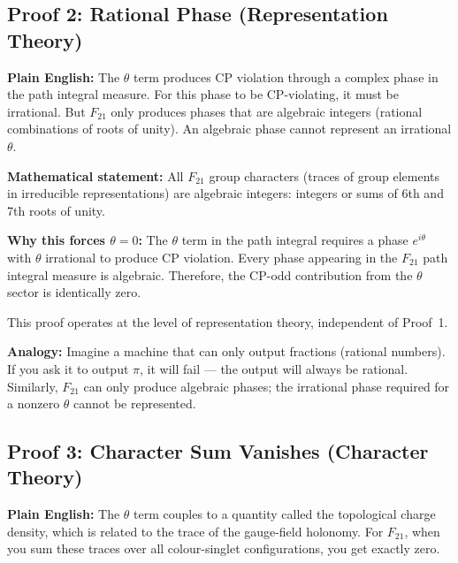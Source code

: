 \documentclass[11pt,a4paper]{article}
\begin{document}
\subsection{Proof 2: Rational Phase (Representation Theory)}

\noindent\textbf{Plain English:}  The $\theta$ term produces CP violation through a complex phase in the path integral measure.  For this phase to be CP-violating, it must be irrational.  But $F_{21}$ only produces phases that are algebraic integers (rational combinations of roots of unity).  An algebraic phase cannot represent an irrational $\theta$.

\begin{tcolorbox}[colback=boxblue,colframe=blue!40!black,title=Proof 2: Rational Phase]
\textbf{Mathematical statement:}  All $F_{21}$ group characters (traces of group elements in irreducible representations) are algebraic integers: integers or sums of 6th and 7th roots of unity.

\textbf{Why this forces $\theta = 0$:}  The $\theta$ term in the path integral requires a phase $e^{i\theta}$ with $\theta$ irrational to produce CP violation.  Every phase appearing in the $F_{21}$ path integral measure is algebraic.  Therefore, the CP-odd contribution from the $\theta$ sector is identically zero.

This proof operates at the level of representation theory, independent of Proof~1.
\end{tcolorbox}

\medskip\noindent\textbf{Analogy:}  Imagine a machine that can only output fractions (rational numbers).  If you ask it to output $\pi$, it will fail --- the output will always be rational.  Similarly, $F_{21}$ can only produce algebraic phases; the irrational phase required for a nonzero $\theta$ cannot be represented.

\subsection{Proof 3: Character Sum Vanishes (Character Theory)}

\noindent\textbf{Plain English:}  The $\theta$ term couples to a quantity called the topological charge density, which is related to the trace of the gauge-field holonomy.  For $F_{21}$, when you sum these traces over all colour-singlet configurations, you get exactly zero.
\end{document}
